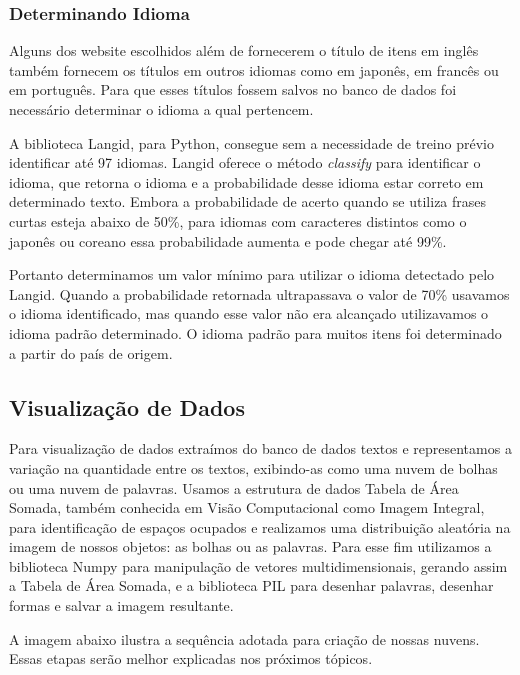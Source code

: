 \documentclass[12pt]{article}
\begin{document}
\subsubsection{Determinando Idioma}

Alguns dos website escolhidos além de fornecerem o título de itens em inglês também fornecem os títulos em outros idiomas como em japonês, em francês ou em português. Para que esses títulos fossem salvos no banco de dados foi necessário determinar o idioma a qual pertencem. 

A biblioteca Langid, para Python, consegue sem a necessidade de treino prévio identificar até 97 idiomas. Langid oferece o método \emph{classify} para identificar o idioma, que retorna o idioma e a probabilidade desse idioma estar correto em determinado texto. Embora a probabilidade de acerto quando se utiliza frases curtas esteja abaixo de 50\%, para idiomas com caracteres distintos como o japonês ou coreano essa probabilidade aumenta e pode chegar até 99\%.

Portanto determinamos um valor mínimo para utilizar o idioma detectado pelo Langid. Quando a probabilidade retornada ultrapassava o valor de 70\% usavamos o idioma identificado, mas quando esse valor não era alcançado utilizavamos o idioma padrão  determinado. O idioma padrão para muitos itens foi determinado a partir do país de origem.

\subsection{Visualização de Dados}

Para visualização de dados extraímos do banco de dados textos e representamos a variação na quantidade entre os textos, exibindo-as como uma nuvem de bolhas ou uma nuvem de palavras. 
Usamos a estrutura de dados Tabela de Área Somada, também conhecida em Visão Computacional como Imagem Integral, para identificação de espaços ocupados e realizamos uma distribuição aleatória na imagem de nossos objetos: as bolhas ou as palavras.
Para esse fim utilizamos a biblioteca Numpy para manipulação de vetores multidimensionais, gerando assim a Tabela de Área Somada, e a biblioteca PIL para desenhar palavras, desenhar formas e salvar a imagem resultante.


A imagem abaixo ilustra a sequência adotada para criação de nossas nuvens. Essas etapas serão melhor explicadas nos próximos tópicos.
\end{document}
